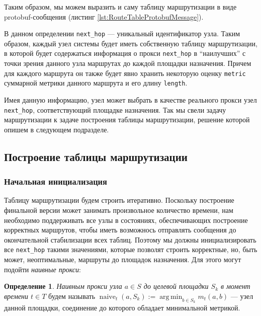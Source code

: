 \documentclass{article}
\theoremstyle{plain}
\theoremstyle{plain}
\theoremstyle{plain}
\theoremstyle{plain}
\theoremstyle{definition}
\newtheorem{definition}{Определение}[section]
\theoremstyle{remark}
\theoremstyle{plain}
\DeclareMathOperator*{\argmin}{arg\,min}
\DeclareMathOperator*{\naive}{naive}
\begin{document}
Таким образом, мы можем выразить и саму таблицу маршрутизации в виде protobuf-сообщения (листинг \ref{lst:RouteTableProtobufMessage}).
    

В данном определении \texttt{next\_hop} --- уникальный идентификатор узла. Таким образом, каждый узел системы будет иметь собственную таблицу маршрутизации, в которой будет содержаться информация о прокси \texttt{next\_hop} в \enquote{наилучших} с точки зрения данного узла маршрутах до каждой площадки назначения. Причем для каждого маршрута он также будет явно хранить некоторую оценку \texttt{metric} суммарной метрики данного маршрута и его длину \texttt{length}.

Имея данную информацию, узел может выбрать в качестве реального прокси узел \texttt{next\_hop}, соответствующий площадке назначения. Так мы свели задачу маршрутизации к задаче построения таблицы маршрутизации, решение которой опишем в следующем подразделе.

\subsection{Построение таблицы маршрутизации}

\subsubsection{Начальная инициализация}
\label{RT_Initialization}

Таблицу маршрутизации будем строить итеративно. Поскольку построение финальной версии может занимать произвольное количество времени, нам необходимо поддерживать все узлы в состояниях, обеспечивающих построение корректных маршрутов, чтобы иметь возможнось отправлять сообщения до окончательной стабилизации всех таблиц. Поэтому мы должны инициализировать все \texttt{next\_hop} такими значениями, которые позволят строить корректные, но, быть может, неоптимальные, маршруты до площадок назначения. Для этого могут подойти \textit{наивные прокси}:

\begin{definition}
    \textit{Наивным прокси узла $a \in S$ до целевой площадки $S_k$ в момент времени $t \in T$} будем называть $\naive_t(a, S_k) := \displaystyle \argmin_{b \in S_k} m_t(a, b)$ --- узел данной площадки, соединение до которого обладает минимальной метрикой.
\end{definition}
\end{document}

